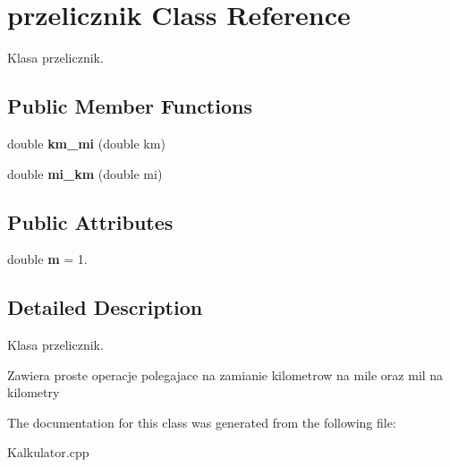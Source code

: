 \hypertarget{classprzelicznik}{\section{przelicznik Class Reference}
\label{classprzelicznik}
}


Klasa przelicznik.  


\subsection*{Public Member Functions}
\begin{DoxyCompactItemize}
\item 
\hypertarget{classprzelicznik_af16918bffe6d4e2e45a498a9bb4d7344}{double {\bfseries km\+\_\+mi} (double km)}\label{classprzelicznik_af16918bffe6d4e2e45a498a9bb4d7344}

\item 
\hypertarget{classprzelicznik_a5892f14824367d5a5afe25e01b68fe13}{double {\bfseries mi\+\_\+km} (double mi)}\label{classprzelicznik_a5892f14824367d5a5afe25e01b68fe13}

\end{DoxyCompactItemize}
\subsection*{Public Attributes}
\begin{DoxyCompactItemize}
\item 
\hypertarget{classprzelicznik_acccf8fd1a56dabc8f58237eff8144e36}{double {\bfseries m} = 1.}\label{classprzelicznik_acccf8fd1a56dabc8f58237eff8144e36}

\end{DoxyCompactItemize}


\subsection{Detailed Description}
Klasa przelicznik. 

Zawiera proste operacje polegajace na zamianie kilometrow na mile oraz mil na kilometry 

The documentation for this class was generated from the following file\+:\begin{DoxyCompactItemize}
\item 
Kalkulator.\+cpp\end{DoxyCompactItemize}
